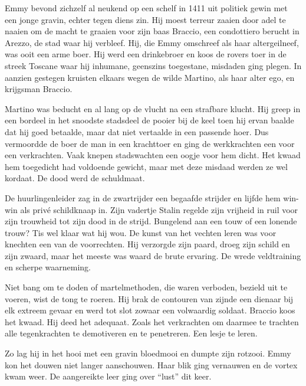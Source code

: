 Emmy bevond zichzelf al neukend op een schelf in 1411 uit politiek gewin met een jonge gravin, echter tegen diens zin. Hij moest terreur zaaien door adel te naaien om de macht te graaien voor zijn baas Braccio, een condottiero berucht in Arezzo, de stad waar hij verbleef. Hij, die Emmy omschreef als haar altergeilneef, was ooit een arme boer. Hij werd een drinkebroer en koos de rovers toer in de streek Toscane waar hij inhumane, geenszins toegestane, misdaden ging plegen. In aanzien gestegen kruisten elkaars wegen de wilde Martino, als haar alter ego, en krijgsman Braccio.

Martino was beducht en al lang op de vlucht na een strafbare klucht. Hij greep in een bordeel in het snoodste stadsdeel de pooier bij de keel toen hij ervan baalde dat hij goed betaalde, maar dat niet vertaalde in een passende hoer. Dus vermoordde de boer de man in een krachttoer en ging de werkkrachten een voor een verkrachten. Vaak knepen stadswachten een oogje voor hem dicht. Het kwaad hem toegedicht  had voldoende gewicht, maar met deze misdaad werden ze wel kordaat. De dood werd de schuldmaat.

De huurlingenleider zag in de zwartrijder een begaafde strijder en lijfde hem win-win als privé schildknaap in. Zijn vadertje Stalin regelde zijn vrijheid in ruil voor zijn trouwheid tot zijn dood in de strijd. Bungelend aan een touw of een lonende trouw? Tis wel klaar wat hij wou. De kunst van het vechten leren was voor knechten een van de voorrechten. Hij verzorgde zijn paard, droeg zijn schild en zijn zwaard, maar het meeste was waard de brute ervaring. De wrede veldtraining en scherpe waarneming.

Niet bang om te doden of martelmethoden, die waren verboden, bezield uit te voeren, wist de tong te roeren. Hij brak de contouren van zijnde een dienaar bij elk extreem gevaar en werd tot slot zowaar een volwaardig soldaat. Braccio koos het kwaad. Hij deed het adequaat. Zoals het verkrachten om daarmee te trachten alle tegenkrachten te demotiveren en te penetreren. Een lesje te leren.

Zo lag hij in het hooi met een gravin bloedmooi en dumpte zijn rotzooi. Emmy kon het douwen niet langer aanschouwen. Haar blik ging vernauwen en de vortex kwam weer. De aangereikte leer ging over “lust” dit keer.

